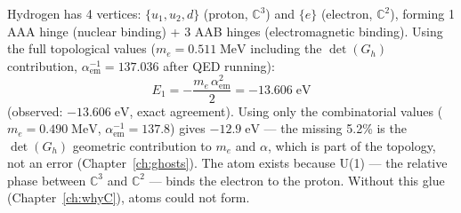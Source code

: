 Hydrogen has 4 vertices: $\{u_1, u_2, d\}$ (proton, $\mathbb{C}^3$) and $\{e\}$ (electron, $\mathbb{C}^2$), forming 1 AAA hinge (nuclear binding) + 3 AAB hinges (electromagnetic binding). Using the full topological values ($m_e = 0.511\;\text{MeV}$ including the $\det(G_h)$ contribution, $\alpha_\text{em}^{-1} = 137.036$ after QED running):
\begin{equation}
E_1 = -\frac{m_e\,\alpha_\text{em}^2}{2} = -13.606\;\text{eV}
\end{equation}
(observed: $-13.606\;\text{eV}$, exact agreement). Using only the combinatorial values ($m_e = 0.490\;\text{MeV}$, $\alpha_\text{em}^{-1} = 137.8$) gives $-12.9\;\text{eV}$ --- the missing 5.2\% is the $\det(G_h)$ geometric contribution to $m_e$ and $\alpha$, which is part of the topology, not an error (Chapter~\ref{ch:ghosts}). The atom exists because U(1) --- the relative phase between $\mathbb{C}^3$ and $\mathbb{C}^2$ --- binds the electron to the proton. Without this glue (Chapter~\ref{ch:whyC}), atoms could not form.
